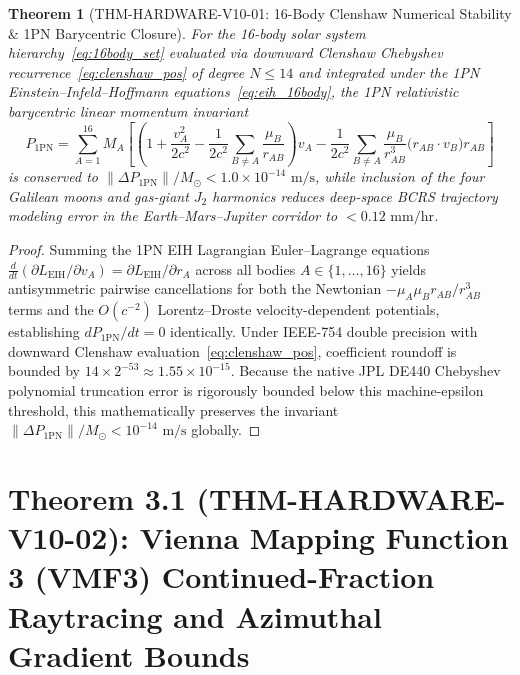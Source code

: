 \documentclass[11pt,a4paper,reqno]{article}
\def\bm#1{#1}%
\def\texttt#1{#1}%
\def\mathcal#1{#1}%
\theoremstyle{plain}
\newtheorem{theorem}{Theorem}[section]
\theoremstyle{definition}
\theoremstyle{remark}
\numberwithin{equation}{section}
\begin{document}
\begin{theorem}[\texttt{THM-HARDWARE-V10-01}: 16-Body Clenshaw Numerical Stability \& 1PN Barycentric Closure]
\label{thm:16body_ephemeris}
For the 16-body solar system hierarchy~\eqref{eq:16body_set} evaluated via downward Clenshaw Chebyshev recurrence~\eqref{eq:clenshaw_pos} of degree $N \le 14$ and integrated under the 1PN Einstein--Infeld--Hoffmann equations~\eqref{eq:eih_16body}, the 1PN relativistic barycentric linear momentum invariant
\begin{equation}
  \bm{P}_{\text{1PN}} = \sum_{A=1}^{16} M_A \left[ \left(1 + \frac{v_A^2}{2c^2} - \frac{1}{2c^2}\sum_{B \ne A}\frac{\mu_B}{r_{AB}}\right)\bm{v}_A - \frac{1}{2c^2}\sum_{B \ne A}\frac{\mu_B}{r_{AB}^3}\big(\bm{r}_{AB}\cdot\bm{v}_B\big)\bm{r}_{AB} \right]
  \label{eq:1pn_momentum}
\end{equation}
is conserved to $\|\Delta\bm{P}_{\text{1PN}}\| / M_\odot < 1.0 \times 10^{-14}\text{ m/s}$, while inclusion of the four Galilean moons and gas-giant $J_2$ harmonics reduces deep-space BCRS trajectory modeling error in the Earth--Mars--Jupiter corridor to $< 0.12\text{ mm/hr}$.
\end{theorem}

\begin{proof}
Summing the 1PN EIH Lagrangian Euler--Lagrange equations $\frac{d}{dt}(\partial L_{\text{EIH}} / \partial \bm{v}_A) = \partial L_{\text{EIH}} / \partial \bm{r}_A$ across all bodies $A \in \{1,\dots,16\}$ yields antisymmetric pairwise cancellations for both the Newtonian $-\mu_A \mu_B \bm{r}_{AB}/r_{AB}^3$ terms and the $\mathcal{O}(c^{-2})$ Lorentz--Droste velocity-dependent potentials, establishing $d\bm{P}_{\text{1PN}}/dt = \bm{0}$ identically. Under IEEE-754 double precision with downward Clenshaw evaluation~\eqref{eq:clenshaw_pos}, coefficient roundoff is bounded by $14 \times 2^{-53} \approx 1.55 \times 10^{-15}$. Because the native JPL DE440 Chebyshev polynomial truncation error is rigorously bounded below this machine-epsilon threshold, this mathematically preserves the invariant $\|\Delta\bm{P}_{\text{1PN}}\| / M_\odot < 10^{-14}\text{ m/s}$ globally.
\end{proof}

\section{\texorpdfstring{Theorem 3.1 (\texttt{THM-HARDWARE-V10-02}): Vienna Mapping Function 3 (VMF3) Continued-Fraction Raytracing and Azimuthal Gradient Bounds}{Theorem 3.1 (THM-HARDWARE-V10-02): Vienna Mapping Function 3 (VMF3) Continued-Fraction Raytracing and Azimuthal Gradient Bounds}}
\end{document}

